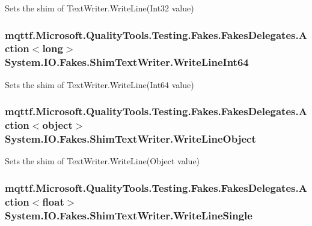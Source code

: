 Sets the shim of Text\-Writer.\-Write\-Line(\-Int32 value)

\hypertarget{class_system_1_1_i_o_1_1_fakes_1_1_shim_text_writer_aba9da58569496537b0596c8364b7be79}{
\subsubsection[{Write\-Line\-Int64}]{\setlength{\rightskip}{0pt plus 5cm}mqttf.\-Microsoft.\-Quality\-Tools.\-Testing.\-Fakes.\-Fakes\-Delegates.\-Action$<$long$>$ System.\-I\-O.\-Fakes.\-Shim\-Text\-Writer.\-Write\-Line\-Int64\hspace{0.3cm}{\ttfamily [set]}}}\label{class_system_1_1_i_o_1_1_fakes_1_1_shim_text_writer_aba9da58569496537b0596c8364b7be79}


Sets the shim of Text\-Writer.\-Write\-Line(\-Int64 value)

\hypertarget{class_system_1_1_i_o_1_1_fakes_1_1_shim_text_writer_acf4fa1bc525382fef697e0588db86000}{
\subsubsection[{Write\-Line\-Object}]{\setlength{\rightskip}{0pt plus 5cm}mqttf.\-Microsoft.\-Quality\-Tools.\-Testing.\-Fakes.\-Fakes\-Delegates.\-Action$<$object$>$ System.\-I\-O.\-Fakes.\-Shim\-Text\-Writer.\-Write\-Line\-Object\hspace{0.3cm}{\ttfamily [set]}}}\label{class_system_1_1_i_o_1_1_fakes_1_1_shim_text_writer_acf4fa1bc525382fef697e0588db86000}


Sets the shim of Text\-Writer.\-Write\-Line(\-Object value)

\hypertarget{class_system_1_1_i_o_1_1_fakes_1_1_shim_text_writer_a2e6dd9ed743c1f0814b12e8bf114e2fe}{
\subsubsection[{Write\-Line\-Single}]{\setlength{\rightskip}{0pt plus 5cm}mqttf.\-Microsoft.\-Quality\-Tools.\-Testing.\-Fakes.\-Fakes\-Delegates.\-Action$<$float$>$ System.\-I\-O.\-Fakes.\-Shim\-Text\-Writer.\-Write\-Line\-Single\hspace{0.3cm}{\ttfamily [set]}}}\label{class_system_1_1_i_o_1_1_fakes_1_1_shim_text_writer_a2e6dd9ed743c1f0814b12e8bf114e2fe}


